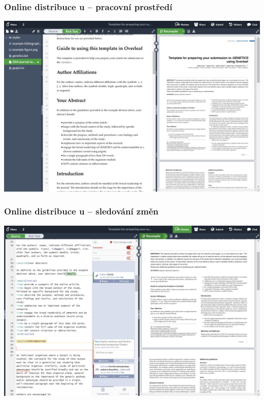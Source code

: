 \begin{frame}
	\frametitle{Online distribuce u -- pracovní prostředí}
	\begin{center}
		\includegraphics[width=\textwidth]{Lecture1/Figures/Overleaf-journal-template-richtext-example-hires.png}
	\end{center}
\end{frame}


\begin{frame}
	\frametitle{Online distribuce u -- sledování změn}
	\begin{center}
		\includegraphics[width=\textwidth]{Lecture1/Figures/Overleaf-journal-template-source-trackchanges-example-hires.png}
	\end{center}
\end{frame}


